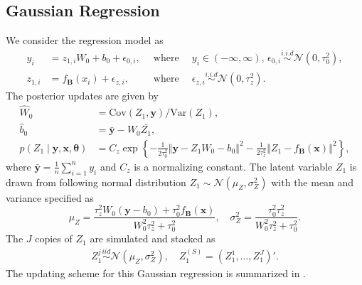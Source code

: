 \documentclass[ba]{imsart}
\newcommand{\bm}[1]{\boldsymbol{#1}}
\newcommand{\Var}{\mathsf{Var\,}}
\newcommand{\iid}{\stackrel{iid}{\sim}}
\newcommand{\norm}[1]{\left\Vert#1\right\Vert}
\def\B{\bm{B}}
\def\x{\bm{x}}
\def\y{\bm{y}}
\def\btheta{\bm{\theta}}
\def\Var{\text{Var}}
\def\Cov{\text{Cov}}
\def\mN{\mathcal{N}}
\newcommand{\bx}{{\bm x}}
\newcommand{\by}{{\bm y}}
\numberwithin{equation}{section}
\theoremstyle{plain}
\begin{document}
\subsection{Gaussian Regression}\label{sec:gr}
We consider the regression model as
\begin{align*}
y_i&=z_{1,i}W_0+b_0+\epsilon_{0,i}, \, &\text{ where }& \, y_i  \in (-\infty,\infty),\, \epsilon_{0,i} \overset{i.i.d}{\sim} \mN(0, \tau_0^2),\\
z_{1,i} & = f_{\B}(x_i)+\epsilon_{z,i}, \, &\text{ where }& \,\epsilon_{z,i} \overset{i.i.d}{\sim} \mN(0, \tau_z^2).
\end{align*}
The posterior updates are given by
\begin{align}
\hat W_0 &= \Cov(Z_1,\by)/\Var(Z_1)\label{eq:W0_gauss},\\
\hat b_0 &= \bar{\by}-W_0\bar{Z_1} \label{eq:b0},\\
p(Z_1\mid \y, \x, \btheta) &= C_z \exp\left\{-\frac{1}{2\tau_0^2} \norm{\by-Z_1W_0-b_0}^2-\frac{1}{2\tau_z^2}\norm{Z_1- f_{\B}(\bx)}^2 \right\}, \nonumber
\end{align}
where $\bar{\by}=\frac{1}{n}\sum_{i=1}^n y_i$ and $C_z$ is a normalizing constant. The latent variable $Z_1$ is drawn from following normal distribution $Z_{1} \sim \mN(\mu_Z, \sigma_Z^2)$ 
with the mean and variance specified as
\begin{equation}\label{eq:Z0_gauss}
\mu_Z=\frac{\tau_z^2 W_0(\by- b_0)+\tau_0^2f_{\B}(\bx)}{ W_0^2\tau_z^2+\tau_0^2}, \quad \sigma_Z^2=\frac{\tau_0^2\tau_z^2}{ W_0^2\tau_z^2+\tau_0^2}.
\end{equation}
The $J$ copies of $Z_1$ are simulated and stacked as
\begin{align*}
Z_1^j \iid  \mN(\mu_Z, \sigma_Z^2), \quad Z_1^{(S)}=(Z_1^1, \ldots, Z_1^J)'.
\end{align*} 
The updating scheme  for this Gaussian regression is summarized in  .
\end{document}
